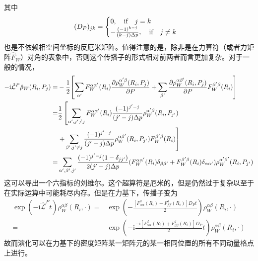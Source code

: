 \documentclass[UTF8,12pt]{article}
\begin{document}
\begin{itemize}
            其中
            \begin{equation}
                (D_P)_{jk}=\begin{cases}
                    0,\qif j=k\\
                    -\frac{(-1)^{k-j}}{(k-j)\Delta p},\qif j\neq k
                \end{cases}
            \end{equation}
            也是不依赖相空间坐标的反厄米矩阵。值得注意的是，除非是在力算符（或者力矩阵$\hat{F}_W$）对角的表象中，否则这个传播子的形式相对前两者而言更加复杂。对于一般的情况，
            \begin{align}
                -\mathrm{i}\hat{\mathcal{L}}^P\hat{\rho}_W(R_i,P_j)=&-\frac{1}{2}\qty[\sum_{\alpha'}{F_W^{\alpha\alpha'}(R_i)\pdv{\rho_W^{\alpha'\beta}(R_i,P_j)}{P}}+\sum_{\beta'}{\pdv{\rho_W^{\alpha\beta'}(R_i,P_j)}{P}F_W^{\beta'\beta}(R_i)}] \\
                =&\frac{1}{2}\left[\sum_{\alpha',j'\neq j}{F_W^{\alpha\alpha'}(R_i)\frac{(-1)^{j'-j}}{(j'-j)\Delta p}\rho_W^{\alpha'\beta}(R_i,P_{j'})}\right. \nonumber \\
                &\left.+\sum_{\beta',j'\neq j}{\frac{(-1)^{j'-j}}{(j'-j)\Delta p}\rho_W^{\alpha\beta'}(R_i,P_{j'})F_W^{\beta'\beta}(R_i)}\right] \\
                =&\sum_{\alpha',\beta',j'}{\frac{(-1)^{j'-j}(1-\delta_{jj'})}{2(j'-j)\Delta p}(F_W^{\alpha\alpha'}(R_i)\delta_{\beta\beta'}+F_W^{\beta'\beta}(R_i)\delta_{\alpha\alpha'})\rho_W^{\alpha'\beta'}(R_i,P_{j'})}
            \end{align}
            这可以导出一个六指标的刘维尔。这个超算符是厄米的，但是仍然过于复杂以至于在实际运算中可能耗尽内存。但是在力基下，传播子变为
            \begin{align}
                \exp(-\mathrm{i}\hat{\mathcal{L}}^Pt)\rho_W^{\alpha\beta}(R_i,\cdot)=&\exp(-\frac{[F^d_{\alpha\alpha}(R_i)+F^d_{\beta\beta}(R_i)]D_Pt}{2})\rho_W^{\alpha\beta}(R_i,\cdot) \\
                =&\exp(-\mathrm{i}\frac{-\mathrm{i}[F^d_{\alpha\alpha}(R_i)+F^d_{\beta\beta}(R_i)]D_P}{2}t)\rho_W^{\alpha\beta}(R_i,\cdot)
            \end{align}
            故而演化可以在力基下的密度矩阵某一矩阵元的某一相同位置的所有不同动量格点上进行。
        \end{itemize}
\end{document}

